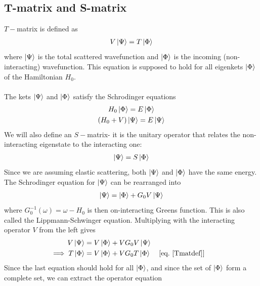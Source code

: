 \documentclass[twoside]{report}
\numberwithin{equation}{section}
\begin{document}
\subsection{T-matrix and S-matrix}
\(T-\)matrix is defined as\cite{sakurai}
\begin{equation}\begin{aligned}
\label{Tmatdef}
V\ket{\Psi} = T\ket{\Phi}
\end{aligned}\end{equation}
where \(\ket{\Psi}\) is the total scattered wavefunction and \(\ket{\Phi}\) is the incoming (non-interacting) wavefunction. This equation is supposed to hold for all eigenkets \(\ket{\Phi}\) of the Hamiltonian \(H_0\). 
\\\\The kets \(\ket{\Psi}\) and \(\ket{\Phi}\) satisfy the Schrodinger equations
\begin{gather}
	H_0 \ket{\Phi} = E \ket{\Phi}\\
(H_0 + V)\ket{\Psi} = E \ket{\Psi}
\end{gather}
We will also define an \(S-\)matrix- it is the unitary operator that relates the non-interacting eigenstate to the interacting one:
\begin{equation}\begin{aligned}
\label{Smatdef}
\ket{\Psi} = S\ket{\Phi}
\end{aligned}\end{equation}
Since we are assuming elastic scattering, both \(\ket{\Psi}\) and \(\ket{\Phi}\) have the same energy.
The Schrodinger equation for \(\ket{\Psi}\) can be rearranged into
\begin{equation}\begin{aligned}
	\label{lse}
\ket{\Psi} = \ket{\Phi} + G_0V\ket{\Psi}
\end{aligned}\end{equation}
where \(G_0^{-1}(\omega) = \omega - H_0\) is then on-interacting Greens function.
This is also called the Lippmann-Schwinger equation.
Multiplying with the interacting operator \(V\) from the left gives
\begin{equation}\begin{aligned}
	V\ket{\Psi} &= V\ket{\Phi} + VG_0V\ket{\Psi}\\
	\implies T\ket{\Phi} &= V\ket{\Phi} + VG_0 T\ket{\Phi} && \left[ \text{eq.~\ref{Tmatdef}} \right] 
\end{aligned}\end{equation}
Since the last equation should hold for all \(\ket{\Phi}\), and since the set of \(\ket{\Phi}\) form a complete set, we can extract the operator equation
\end{document}
